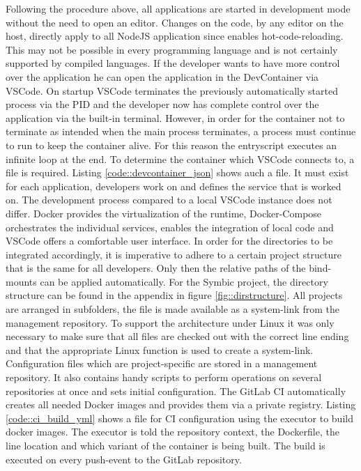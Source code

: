         Following the procedure above, all applications are started in development mode without the need to open an editor. Changes on the code, by any editor on the host, directly apply to all NodeJS application since  enables hot-code-reloading. This may not be possible in every programming language and is not certainly supported by compiled languages.\newline
        If the developer wants to have more control over the application he can open the application in the DevContainer via \ac{VSCode}. On startup \ac{VSCode} terminates the previously automatically started process via the \ac{PID} and the developer now has complete control over the application via the built-in terminal. However, in order for the container not to terminate as intended when the main process terminates, a process must continue to run to keep the container alive. For this reason the entryscript executes an infinite loop at the end. To determine the container which \ac{VSCode} connects to, a  file is required. Listing \ref{code::devcontainer_json} shows auch a  file. It must exist for each application, developers work on and defines the service that is worked on. The development process compared to a local \ac{VSCode} instance does not differ.
        Docker provides the virtualization of the runtime, Docker-Compose orchestrates the individual services, enables the integration of local code and \ac{VSCode} offers a comfortable user interface. In order for the directories to be integrated accordingly, it is imperative to adhere to a certain project structure that is the same for all developers. Only then the relative paths of the bind-mounts can be applied automatically. For the Symbic project, the directory structure can be found in the appendix in figure \ref{fig::dirstructure}. All projects are arranged in subfolders, the  file is made available as a system-link from the management repository. To support the architecture under Linux it was only necessary to make sure that all files are checked out with the correct line ending and that the appropriate Linux function is used to create a system-link.\newline
        Configuration files which are project-specific are stored in a management repository. It also contains handy scripts to perform operations on several repositories at once and sets initial configuration. The GitLab \ac{CI} automatically creates all needed Docker images and provides them via a private registry. Listing \ref{code::ci_build_yml} shows a  file for \ac{CI} configuration using the  executor to build docker images. The executor is told the repository context, the Dockerfile, the line location and which variant of the container is being built. The build is executed on every push-event to the GitLab repository.\newline
